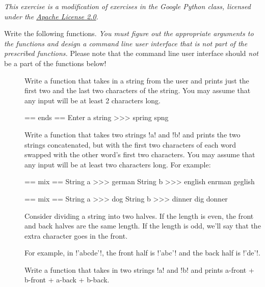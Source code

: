 \documentclass[11pt]{cselabheader}
\begin{document}
\begin{ex}[stringfun.py]
\emph{This exercise is a modification of exercises in the Google Python
  class, licensed under the
  \href{http://www.apache.org/licenses/LICENSE-2.0.html}{Apache License 2.0}.}

Write the following functions. \emph{You must figure out the appropriate
  arguments to the functions and design a command line user interface that is
not part of the prescribed functions.} Please note that the command line user
interface should \emph{not} be a part of the functions below!

\begin{description}
  \item[]
  Write a function that takes in a string from the user and
  prints just the first two and the last two characters of the string.
  You may assume that any input will be at least 2 characters long.

  \begin{verbatimcode}
== ends ==
Enter a string >>> spring
spng
  \end{verbatimcode}

  \item[]
Write a function that takes two strings \pythoninline!a! and
  \pythoninline!b! and prints the two strings concatenated, but with the first
  two characters of each word swapped with the other word's first two
  characters. You may assume that any input will be at least two characters
  long.
  For example:

  \begin{verbatimcode}
== mix ==
String a >>> german
String b >>> english
enrman geglish
  \end{verbatimcode}

  \begin{verbatimcode}
== mix ==
String a >>> dog
String b >>> dinner
dig donner
  \end{verbatimcode}

  \item[]
Consider dividing a string into two halves. If the length
  is even, the front and back halves are the same length. If the length is odd,
  we'll say that the extra character goes in the front.

  For example, in \pythoninline!'abcde'!, the front half is \pythoninline!'abc'!
  and the back half is \pythoninline!'de'!.

  Write a function that takes in two strings \pythoninline!a! and
  \pythoninline!b!  and prints a-front + b-front + a-back + b-back.


\end{description}
\end{ex}
\end{document}
